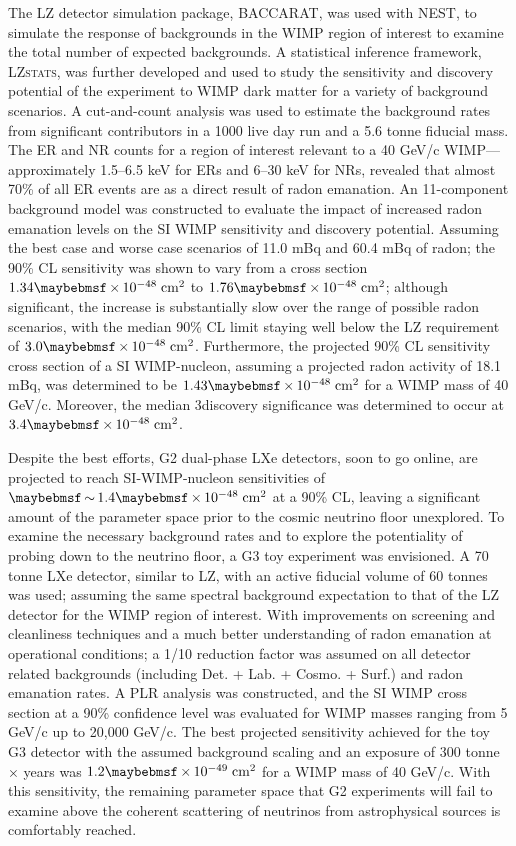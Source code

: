 The LZ detector simulation package, \textsc{BACCARAT}, was used with \textsc{NEST}, to simulate the response of backgrounds in the WIMP region of interest to examine the total number of expected backgrounds. A statistical inference framework, \textsc{LZstats}, was further developed and used to study the sensitivity and discovery potential of the experiment to WIMP dark matter for a variety of background scenarios. A cut-and-count analysis was used to estimate the background rates from significant contributors in a 1000 live day run and a 5.6 tonne fiducial mass. The ER and NR counts for a region of interest relevant to a 40 GeV/c\squared{} WIMP---approximately 1.5–6.5 keV for ERs and 6–30 keV for NRs, revealed that almost 70\% of all ER events are as a direct result of radon emanation. An 11-component background model was constructed to evaluate the impact of increased radon emanation levels on the SI WIMP sensitivity and discovery potential. Assuming the best case and worse case scenarios of 11.0 mBq and 60.4 mBq of radon; the 90\% CL sensitivity was shown to vary from a cross section $1.34\times10^{-48} \; \MathText{cm}^{2}$ to $1.76\times10^{-48} \; \MathText{cm}^{2}$; although significant, the increase is substantially slow over the range of possible radon scenarios, with the median 90\% CL limit staying well below the LZ requirement of $3.0\times10^{-48} \; \MathText{cm}^{2}$. Furthermore, the projected 90\% CL sensitivity cross section of a SI WIMP-nucleon, assuming a projected radon activity of 18.1 mBq, was determined to be $1.43\times10^{-48} \; \MathText{cm}^{2}$ for a WIMP mass of 40 GeV/c\squared{}. Moreover, the median 3\sigma  discovery significance was determined to occur at $3.4\times10^{-48} \; \MathText{cm}^{2}$. 

Despite the best efforts, G2 dual-phase LXe detectors, soon to go online, are projected to reach SI-WIMP-nucleon sensitivities of  $\sim1.4\times10^{-48} \; \MathText{cm}^{2}$ at a 90\% CL, leaving a significant amount of the parameter space prior to the cosmic neutrino floor unexplored. To examine the necessary background rates and to explore the potentiality of probing down to the neutrino floor, a G3 toy experiment was envisioned. A 70 tonne LXe detector, similar to LZ, with an active fiducial volume of 60 tonnes was used; assuming the same spectral background expectation to that of the LZ detector for the WIMP region of interest. With improvements on screening and cleanliness techniques and a much better understanding of radon emanation at operational conditions; a 1/10 reduction factor was assumed on all detector related backgrounds (including Det. + Lab. + Cosmo. + Surf.) and radon emanation rates. A PLR analysis was constructed, and the SI WIMP cross section at a 90\% confidence level was evaluated for WIMP masses ranging from 5 GeV/c\squared{} up to 20,000 GeV/c\squared{}. The best projected sensitivity achieved for the toy G3 detector with the assumed background scaling and an exposure of 300 tonne $\times$ years was $1.2\times10^{-49} \; \MathText{cm}^{2}$ for a WIMP mass of 40 GeV/c\squared{}. With this sensitivity, the remaining parameter space that G2 experiments will fail to examine above the coherent scattering of neutrinos from astrophysical sources is comfortably reached.

